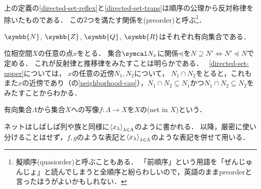\documentclass{ltjsbook}
\begin{document}
上の定義の\ref{directed-set-reflex}と\ref{directed-set-trans}は順序の公理から反対称律を除いたものである．
この\(2\)つを満たす関係を(preorder)と呼ぶ\footnote{%
擬順序(quasiorder)と呼ぶこともある．
「前順序」という用語を「ぜんじゅんじょ」と読んでしまうと全順序と紛らわしいので，英語のままpreorderと言ったほうがよいかもしれない．}．

\begin{exa} \(\symbb{N}\), \(\symbb{Z}\), \(\symbb{Q}\), \(\symbb{R}\)はそれぞれ有向集合である．
\end{exa}

\begin{exa} 位相空間\(X\)の任意の点\(x\)をとる．
集合\(\Neighborhood{x}\)に関係\(\mathord{\preceq}\)を\(N \supseteq N' \Leftrightarrow N' \preceq N\)で定める．
これが反射律と推移律をみたすことは明らかである．
~\ref{directed-set-upper}については，
\(x\)の任意の近傍\(N_1, N_2\)について，
\(N_1 \cap N_2\)をとると，これもまた\(x\)の近傍であり（の\ref{neighborhood-cap}），\(N_1 \cap N_2 \subseteq N_1\)かつ\(N_1 \cap N_2 \subseteq N_2\)をみたすことからわかる．
\end{exa}

\begin{thmbox}
\begin{definition}
有向集合\(\Lambda\)から集合\(X\)への写像\(f \colon \Lambda \to X\)を\(X\)の(net in \(X\))という．
\end{definition}
\end{thmbox}

ネットはしばしば列や族と同様に\({\langle {x}_\lambda \rangle}_{\lambda \in \Lambda}\)のように書かれる．
以降，厳密に使い分けることはせず，\(f, g\)のような表記と\({\langle {x}_\lambda \rangle}_{\lambda \in \Lambda}\)のような表記を併せて用いる．
\end{document}
